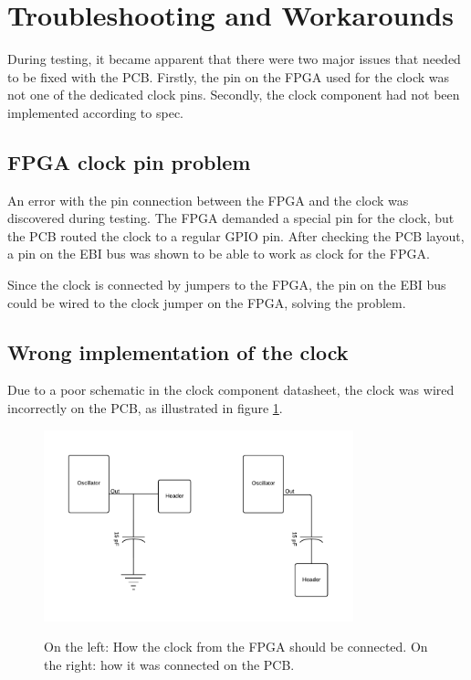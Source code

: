 \documentclass[../main/report.tex]{subfiles}
\begin{document}
\section{Troubleshooting and Workarounds}

During testing, it became apparent that there were two major issues that needed to be fixed with the PCB.
Firstly, the pin on the FPGA used for the clock was not one of the dedicated clock pins.
Secondly, the clock component had not been implemented according to spec.

\subsection*{FPGA clock pin problem}
An error with the pin connection between the FPGA and the clock was discovered during testing.
The FPGA demanded a special pin for the clock, but the PCB routed the clock to a regular GPIO pin.
After checking the PCB layout, a pin on the EBI bus was shown to be able to work as clock for the FPGA.

Since the clock is connected by jumpers to the FPGA, the pin on the EBI bus could be wired to the clock jumper on the FPGA, solving the problem.

\subsection*{Wrong implementation of the clock}

Due to a poor schematic in the clock component datasheet, the clock was wired incorrectly on the PCB, as illustrated in figure \ref{fig:pcb-clock}.

\begin{figure}[H]
    \centering
    \includegraphics[width=0.8\textwidth]{../pcb/assets/pcb-clock.pdf}
    \label{fig:pcb-clock}
    \caption{On the left: How the clock from the FPGA should be connected.
             On the right: how it was connected on the PCB.}
\end{figure}
\end{document}
